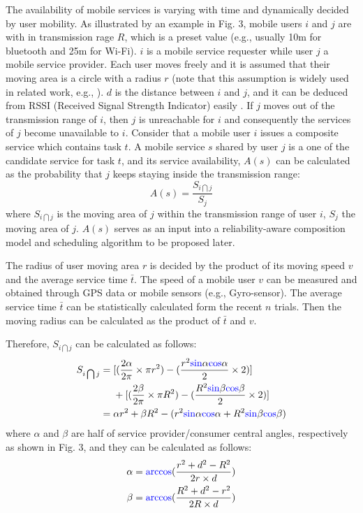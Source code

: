 \documentclass[journal]{IEEEtran}
\begin{document}
The availability of mobile services is varying with time and dynamically decided by user mobility. 
As illustrated by an example in Fig. 3, mobile users $i$ and $j$ are with in transmission rage $R$, which is a preset value (e.g., usually 10m for bluetooth and 25m for Wi-Fi). $i$ is a mobile service requester while user $j$ a mobile service provider. Each user moves freely and it is assumed that their moving area is a circle with a radius $r$ (note that this assumption is widely used in related work, e.g., \cite{Yang2010, Deng2017, wu2001personal}). $d$ is the distance between $i$ and $j$, and it can be deduced from RSSI (Received Signal Strength Indicator) easily \cite{benkic2008using}. If $j$ moves out of the transmission range of $i$, then $j$ is unreachable for $i$ and consequently the services of $j$ become unavailable to $i$.
Consider that a mobile user $i$ issues a composite service which contains task $t$. A mobile service $s$ shared by user $j$ is a one of the candidate service for task $t$, and its service availability, $A(s)$ can be calculated as the probability that $j$ keeps staying inside the transmission range:
\begin{equation}
A(s) = \frac{S_{i \bigcap j}}{S_j}
\end{equation}
where $S_{i \bigcap j}$ is the moving area of $j$ within the transmission range of user $i$, $S_j$ the moving area of $j$. $A(s)$ serves as an input into a reliability-aware composition model and scheduling algorithm to be proposed later.

The radius of user moving area $r$ is decided by the product of its moving speed $v$ and the average service time $\bar{t}$. 
The speed of a mobile user $v$ can be measured and obtained through GPS data or mobile sensors (e.g., Gyro-sensor).
The average service time $\bar{t}$ can be statistically calculated form the recent $n$ trials.
Then the moving radius can be calculated as the product of $\bar{t}$ and $v$.

Therefore, $S_{i \bigcap j}$ can be calculated as follows:
\begin{align}
S_{i \bigcap j} & =  [(\frac{2\alpha}{2\pi} \times \pi r^2)-(\frac{r^2 {\color{blue}{\sin}}\alpha {\color{blue}{\cos}}\alpha}{2} \times 2)]\\\nonumber
& \ \ \ \ +[(\frac{2\beta}{2\pi} \times \pi R^2)-(\frac{R^2 {\color{blue}{\sin}}\beta {\color{blue}{\cos}}\beta}{2} \times 2)]\\\nonumber
& = \alpha r^2 + \beta R^2 - (r^2 {\color{blue}{\sin}}\alpha {\color{blue}{\cos}}\alpha + R^2 {\color{blue}{\sin}}\beta {\color{blue}{\cos}}\beta)
\end{align}
where $\alpha$ and $\beta$ are half of service provider/consumer central angles, respectively as shown in Fig. 3, and they can be calculated as follows:
\begin{eqnarray}
\alpha = {\color{blue}{\arccos}}(\frac{r^2+d^2-R^2}{2r\times d}) \\\nonumber
\beta = {\color{blue}{\arccos}}(\frac{R^2+d^2-r^2}{2R\times d})
\end{eqnarray}
\end{document}
